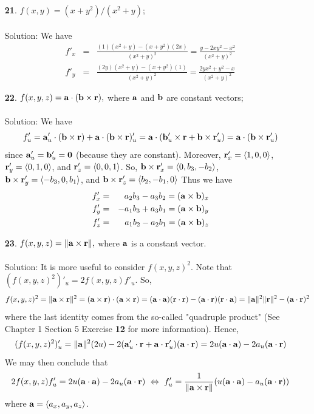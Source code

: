 \documentclass[12pt]{amsbook}
\newcommand{\la}{\langle}
\newcommand{\ra}{\rangle}
\begin{document}
\begin{enumerate}
\item[{\small\bf 21}.] $f(x,y)=(x+y^2)/(x^2+y)$;
\\
\\
{\sc Solution}: We have
\begin{eqnarray*}
f'_x&=& \frac{(1)(x^2+y)-(x+y^2)(2x)}{(x^2+y)^2}=\frac{y-2xy^2-x^2}{(x^2+y)^2} \\
f'_y&=& \frac{(2y)(x^2+y)-(x+y^2)(1)}{(x^2+y)^2}=\frac{2yx^2+y^2-x}{(x^2+y)^2}
\end{eqnarray*}
\item[{\small\bf 22}.] $f(x,y,z)={\bf a}\cdot({\bf b}\times{\bf r}),$ where ${\bf a}$ and ${\bf b}$ are constant vectors;
\\
\\
{\sc Solution}: We have
$$f'_u={\bf a}'_u\cdot({\bf b}\times{\bf r})+{\bf a}\cdot({\bf b}\times{\bf r})'_u={\bf a}\cdot({\bf b}'_u\times{\bf r}+{\bf b}\times{\bf r}'_u)={\bf a}\cdot({\bf b}\times{\bf r}'_u)$$
since ${\bf a}'_u={\bf b}'_u={\bf 0}$ (because they are constant). Moreover, ${\bf r}'_x=\la 1,0,0 \ra$, ${\bf r}'_y=\la 0,1,0 \ra$, and ${\bf r}'_z=\la 0,0,1 \ra$. So, ${\bf b}\times{\bf r}'_x=\la 0,b_3,-b_2\ra$, ${\bf b}\times{\bf r}'_y=\la -b_3,0,b_1\ra$, and ${\bf b}\times{\bf r}'_z=\la b_2,-b_1,0\ra$ Thus we have
\begin{eqnarray*}
f'_x&=& a_2b_3-a_3b_2 = ({\bf a}\times{\bf b})_x  \\
f'_y&=& -a_1b_3+a_3b_1= ({\bf a}\times{\bf b})_y  \\
f'_z&=& a_1b_2-a_2b_1= ({\bf a}\times{\bf b})_z 
\end{eqnarray*}
\item[{\small\bf 23}.] $f(x,y,z)=\|{\bf a}\times{\bf r}\|,$ where ${\bf a}$ is a constant vector.
\\
\\
{\sc Solution}: It is more useful to consider $f(x,y,z)^2$. Note that $(f(x,y,z)^2)'_u=2f(x,y,z)f'_u$. So,
$$f(x,y,z)^2=\|{\bf a}\times{\bf r}\|^2=({\bf a}\times{\bf r})\cdot({\bf a}\times{\bf r})=({\bf a}\cdot {\bf a})({\bf r}\cdot {\bf r})-({\bf a}\cdot {\bf r})({\bf r}\cdot {\bf a})=\|{\bf a}\|^2\|{\bf r}\|^2-({\bf a}\cdot {\bf r})^2$$
where the last identity comes from the so-called "quadruple product" (See Chapter 1 Section 5 Exercise {\bf 12} for more information). 
Hence,
$$(f(x,y,z)^2)'_u=\|{\bf a}\|^2(2u)-2({\bf a}'_u\cdot {\bf r}+{\bf a}\cdot {\bf r}'_u)({\bf a}\cdot {\bf r})=2u({\bf a}\cdot {\bf a})-2a_u({\bf a}\cdot {\bf r})$$
We may then conclude that
$$2f(x,y,z)f'_u=2u({\bf a}\cdot {\bf a})-2a_u({\bf a}\cdot {\bf r}) \ \Leftrightarrow \ f'_u=\frac{1}{\|{\bf a}\times{\bf r}\|}(u({\bf a}\cdot {\bf a})-a_u({\bf a}\cdot {\bf r}))$$
where ${\bf a}=\la a_x,a_y,a_z \ra$. 
\end{enumerate}
\end{document}
